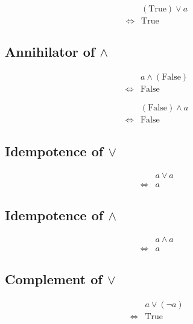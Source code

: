 \begin{prop}
\label{Proposition:lor_annihilator_2}
\begin{align*}
& (\text{True}) \lor a \\
\iff & \text{True}
\end{align*}
\end{prop}

\subsection{Annihilator of $\land$}
\begin{prop}
\label{Proposition:land_annihilator_1}
\begin{align*}
& a \land (\text{False}) \\
\iff & \text{False}
\end{align*}
\end{prop}

\begin{prop}
\label{Proposition:land_annihilator_2}
\begin{align*}
& (\text{False}) \land a \\
\iff & \text{False}
\end{align*}
\end{prop}

\subsection{Idempotence of $\lor$}
\begin{prop}
\label{Proposition:lor_idempotence}
\begin{align*}
& a \lor a \\
\iff & a
\end{align*}
\end{prop}

\subsection{Idempotence of $\land$}
\begin{prop}
\label{Proposition:land_idempotence}
\begin{align*}
& a \land a \\
\iff & a
\end{align*}
\end{prop}

\subsection{Complement of $\lor$}
\begin{prop}
\label{Proposition:lor_complement_1}
\begin{align*}
& a \lor (\lnot a) \\
\iff & \text{True}
\end{align*}
\end{prop}

